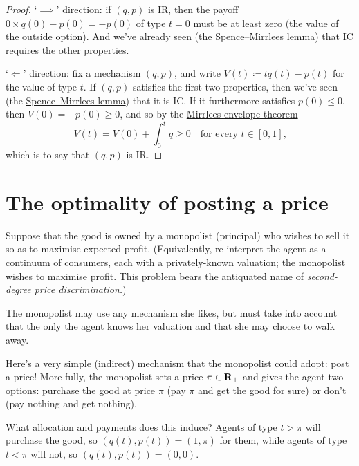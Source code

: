 \begin{proof}
	`$\implies$' direction:
	if $(q,p)$ is IR, then the payoff $0 \times q(0) - p(0) = -p(0)$ of type $t=0$ must be at least zero (the value of the outside option).
	And we've already seen (the \hyperref[proposition:SM_lemma]{Spence--Mirrlees lemma}) that IC requires the other properties.

	`$\Longleftarrow$' direction:
	fix a mechanism $(q,p)$, and
	write $V(t) \coloneqq t q(t) - p(t)$ for the value of type $t$.
	If $(q,p)$ satisfies the first two properties, then we've seen (the \hyperref[proposition:SM_lemma]{Spence--Mirrlees lemma}) that it is IC.
	If it furthermore satisfies $p(0) \leq 0$,
	then $V(0) = -p(0) \geq 0$,
	and so by the \hyperref[proposition:ic_env]{Mirrlees envelope theorem}
	\begin{equation*}
		V(t) = V(0) + \int_0^t q \geq 0 
		\quad \text{for every $t \in [0,1]$,}
	\end{equation*}
	which is to say that $(q,p)$ is IR.
\end{proof}



\section{The optimality of posting a price}
\label{sec:ch1:post}

Suppose that the good is owned by a monopolist (principal) who wishes to sell it so as to maximise expected profit.
(Equivalently, re-interpret the agent as a continuum of consumers, each with a privately-known valuation; the monopolist wishes to maximise profit. This problem bears the antiquated name of \emph{second-degree price discrimination.})

The monopolist may use any mechanism she likes, but must take into account that the only the agent knows her valuation and that she may choose to walk away.

Here's a very simple (indirect) mechanism that the monopolist could adopt: post a price!
More fully, the monopolist sets a price $\pi \in \mathbf{R}_+$
and gives the agent two options:
purchase the good at price $\pi$ (pay $\pi$ and get the good for sure)
or don't (pay nothing and get nothing).

What allocation and payments does this induce?
Agents of type $t > \pi$ will purchase the good, so $(q(t),p(t)) = (1,\pi)$ for them, while agents of type $t < \pi$ will not, so $(q(t),p(t)) = (0,0)$.


